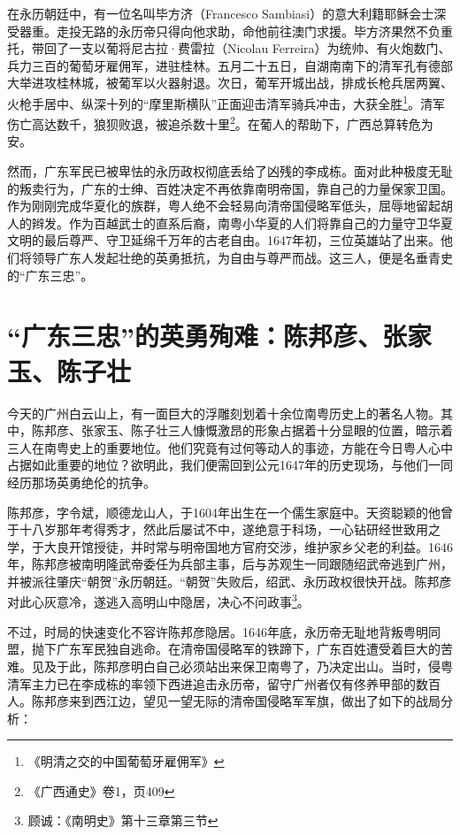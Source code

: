 在永历朝廷中，有一位名叫毕方济（Francesco Sambiasi）的意大利籍耶稣会士深受器重。走投无路的永历帝只得向他求助，命他前往澳门求援。毕方济果然不负重托，带回了一支以葡将尼古拉·费雷拉（Nicolau Ferreira）为统帅、有火炮数门、兵力三百的葡萄牙雇佣军，进驻桂林。五月二十五日，自湖南南下的清军孔有德部大举进攻桂林城，被葡军以火器射退。次日，葡军开城出战，排成长枪兵居两翼、火枪手居中、纵深十列的“摩里斯横队”正面迎击清军骑兵冲击，大获全胜\footnote{《明清之交的中国葡萄牙雇佣军》}。清军伤亡高达数千，狼狈败退，被追杀数十里\footnote{《广西通史》卷1，页409}。在葡人的帮助下，广西总算转危为安。

然而，广东军民已被卑怯的永历政权彻底丢给了凶残的李成栋。面对此种极度无耻的叛卖行为，广东的士绅、百姓决定不再依靠南明帝国，靠自己的力量保家卫国。作为刚刚完成华夏化的族群，粤人绝不会轻易向清帝国侵略军低头，屈辱地留起胡人的辫发。作为百越武士的直系后裔，南粤小华夏的人们将靠自己的力量守卫华夏文明的最后尊严、守卫延绵千万年的古老自由。1647年初，三位英雄站了出来。他们将领导广东人发起壮绝的英勇抵抗，为自由与尊严而战。这三人，便是名垂青史的“广东三忠”。

\section{“广东三忠”的英勇殉难：陈邦彦、张家玉、陈子壮}

\indent 今天的广州白云山上，有一面巨大的浮雕刻划着十余位南粤历史上的著名人物。其中，陈邦彦、张家玉、陈子壮三人慷慨激昂的形象占据着十分显眼的位置，暗示着三人在南粤史上的重要地位。他们究竟有过何等动人的事迹，方能在今日粤人心中占据如此重要的地位？欲明此，我们便需回到公元1647年的历史现场，与他们一同经历那场英勇绝伦的抗争。

陈邦彦，字令斌，顺德龙山人，于1604年出生在一个儒生家庭中。天资聪颖的他曾于十八岁那年考得秀才，然此后屡试不中，遂绝意于科场，一心钻研经世致用之学，于大良开馆授徒，并时常与明帝国地方官府交涉，维护家乡父老的利益。1646年，陈邦彦被南明隆武帝委任为兵部主事，后与苏观生一同跟随绍武帝逃到广州，并被派往肇庆“朝贺”永历朝廷。“朝贺”失败后，绍武、永历政权很快开战。陈邦彦对此心灰意冷，遂逃入高明山中隐居，决心不问政事\footnote{顾诚：《南明史》第十三章第三节}。

不过，时局的快速变化不容许陈邦彦隐居。1646年底，永历帝无耻地背叛粤明同盟，抛下广东军民独自逃命。在清帝国侵略军的铁蹄下，广东百姓遭受着巨大的苦难。见及于此，陈邦彦明白自己必须站出来保卫南粤了，乃决定出山。当时，侵粤清军主力已在李成栋的率领下西进追击永历帝，留守广州者仅有佟养甲部的数百人。陈邦彦来到西江边，望见一望无际的清帝国侵略军军旗，做出了如下的战局分析：

